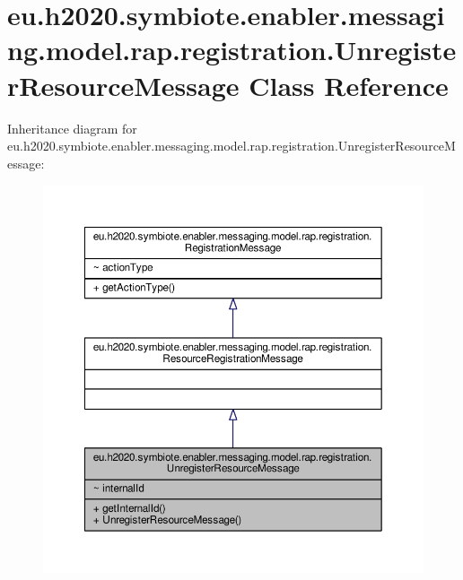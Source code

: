 \hypertarget{classeu_1_1h2020_1_1symbiote_1_1enabler_1_1messaging_1_1model_1_1rap_1_1registration_1_1UnregisterResourceMessage}{}\section{eu.\+h2020.\+symbiote.\+enabler.\+messaging.\+model.\+rap.\+registration.\+Unregister\+Resource\+Message Class Reference}
\label{classeu_1_1h2020_1_1symbiote_1_1enabler_1_1messaging_1_1model_1_1rap_1_1registration_1_1UnregisterResourceMessage}


Inheritance diagram for eu.\+h2020.\+symbiote.\+enabler.\+messaging.\+model.\+rap.\+registration.\+Unregister\+Resource\+Message\+:
\nopagebreak
\begin{figure}[H]
\begin{center}
\leavevmode
\includegraphics[width=350pt]{classeu_1_1h2020_1_1symbiote_1_1enabler_1_1messaging_1_1model_1_1rap_1_1registration_1_1Unregist975c2beae740132074acab882a07d6ca}
\end{center}
\end{figure}


